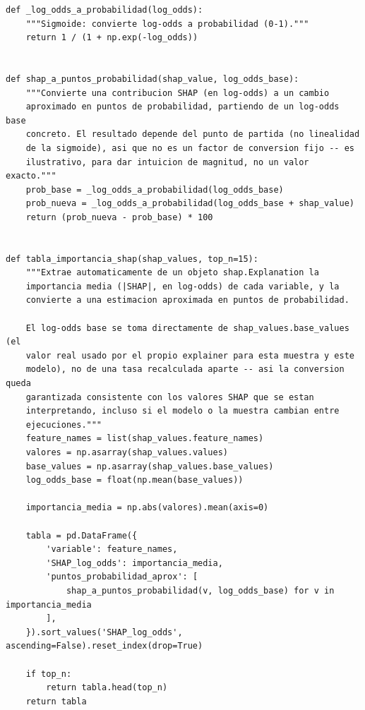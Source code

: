 \documentclass[11pt,a4paper]{article}
\begin{document}
\begin{lstlisting}[caption={Conversión de una contribución SHAP (log-odds) a puntos de probabilidad, y tabla de importancia global.}]
def _log_odds_a_probabilidad(log_odds):
    """Sigmoide: convierte log-odds a probabilidad (0-1)."""
    return 1 / (1 + np.exp(-log_odds))


def shap_a_puntos_probabilidad(shap_value, log_odds_base):
    """Convierte una contribucion SHAP (en log-odds) a un cambio
    aproximado en puntos de probabilidad, partiendo de un log-odds base
    concreto. El resultado depende del punto de partida (no linealidad
    de la sigmoide), asi que no es un factor de conversion fijo -- es
    ilustrativo, para dar intuicion de magnitud, no un valor exacto."""
    prob_base = _log_odds_a_probabilidad(log_odds_base)
    prob_nueva = _log_odds_a_probabilidad(log_odds_base + shap_value)
    return (prob_nueva - prob_base) * 100


def tabla_importancia_shap(shap_values, top_n=15):
    """Extrae automaticamente de un objeto shap.Explanation la
    importancia media (|SHAP|, en log-odds) de cada variable, y la
    convierte a una estimacion aproximada en puntos de probabilidad.

    El log-odds base se toma directamente de shap_values.base_values (el
    valor real usado por el propio explainer para esta muestra y este
    modelo), no de una tasa recalculada aparte -- asi la conversion queda
    garantizada consistente con los valores SHAP que se estan
    interpretando, incluso si el modelo o la muestra cambian entre
    ejecuciones."""
    feature_names = list(shap_values.feature_names)
    valores = np.asarray(shap_values.values)
    base_values = np.asarray(shap_values.base_values)
    log_odds_base = float(np.mean(base_values))

    importancia_media = np.abs(valores).mean(axis=0)

    tabla = pd.DataFrame({
        'variable': feature_names,
        'SHAP_log_odds': importancia_media,
        'puntos_probabilidad_aprox': [
            shap_a_puntos_probabilidad(v, log_odds_base) for v in importancia_media
        ],
    }).sort_values('SHAP_log_odds', ascending=False).reset_index(drop=True)

    if top_n:
        return tabla.head(top_n)
    return tabla



\end{lstlisting}
\end{document}
